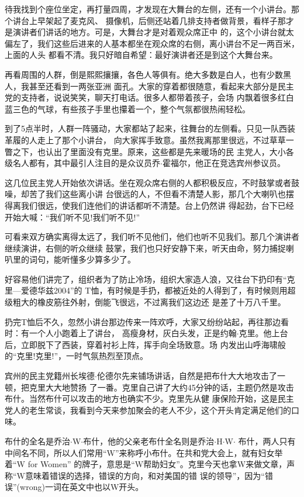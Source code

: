﻿\documentclass[11pt]{article}
\begin{document}
待我找到个座位坐定，再打量四周，才发现在大舞台的左侧，还有一个小讲台。那个讲台上早架起了麦克风、
摄像机，后侧还站着几排支持者做背景，看样子那才是演讲者们讲话的地方。可是，大舞台才是对着观众席正中
的，这个小讲台就太偏左了，我们这些后进来的人基本都坐在观众席的右侧，离小讲台不足一两百米，上面的人头
都看不清。我只好暗自希望：最好演讲者还是到这个大舞台来。

再看周围的人群，倒是熙熙攘攘，各色人等俱有。绝大多数是白人，也有少数黑人，我甚至还看到一两张亚洲
面孔。大家的穿着都很随意，看起来大部分是民主党的支持者，说说笑笑，聊天打电话。很多人都带着孩子，会场
内飘着很多红白蓝三色的气球，有些孩子手里也攥着一个，整个气氛都很热闹轻松。

到了5点半时，人群一阵骚动，大家都站了起来，往舞台的左侧看。只见一队西装革履的人走上了那个小讲台，
向大家挥手致意。虽然我离那里很远，不过草草一瞥之下，也认出了里面没有克里。原来，这些都是先来暖场的民
主党人，大小各级名人都有，其中最引人注目的是众议员乔$\cdot$霍福尔，他正在竞选宾州参议员。

这几位民主党人开始依次讲话。坐在观众席右侧的人都积极反应，不时鼓掌或者鼓噪，却苦了我们这些离小讲
台很远的人，不但看不清楚人影，那几个大喇叭也摆得离我们很远，使我们连他们的讲话都听不清楚。台上仍然讲
得起劲，台下已经开始大喊：``我们听不见!我们听不见!''

可看来双方确实离得太远了，我们听不见他们，他们也听不见我们。那几个演讲者继续演讲，右侧的听众继续
鼓掌，我们也只好安静下来，听天由命，努力捕捉喇叭里的词句，能听懂多少算多少了。

好容易他们讲完了，组织者为了防止冷场，组织大家造人浪，又往台下扔印有``克里---爱德华兹2004''的
T恤，有时候是手扔，都被近处的人得到了，有时候则用超级粗大的橡皮筋往外射，倒能飞很远，不过离我们这边还
是差了十万八千里。

扔完T恤后不久，忽然小讲台那边传来一阵欢呼，大家又纷纷站起，再往那边看时：有一个人小跑着上了讲台，
高瘦身材，灰白头发，正是约翰$\cdot$克里。他上台后，立即脱下了西装，穿着衬衫上阵，挥手向全场致意。场
内发出山呼海啸般的``克里!克里!''，一时气氛热烈至顶点。

宾州的民主党籍州长埃德$\cdot$伦德尔先来铺场讲话，自然是把布什大大地攻击了一顿，把克里大大地赞扬
了一番。克里自己讲了大约45分钟的话，主题仍然是攻击布什。当然布什可以攻击的地方也确实不少。克里先从健
康保险开始，这是民主党人的老生常谈，我看到今天来参加聚会的老人不少，这个开头肯定满足他们的口味。

布什的全名是乔治$\cdot$W$\cdot$布什，他的父亲老布什全名则是乔治$\cdot$H$\cdot$W$\cdot$
布什，两人只有中间名不同，所以人们常用``W''来称呼小布什。在共和党大会上，就有妇女举着``W for Women''
的牌子，意思是``W帮助妇女''。克里今天也拿W来做文章，声称``W意味着错误的选择，错误的方向，和对美国的错
误的领导''，因为``错误''(wrong)一词在英文中也以W开头。
\end{document}

